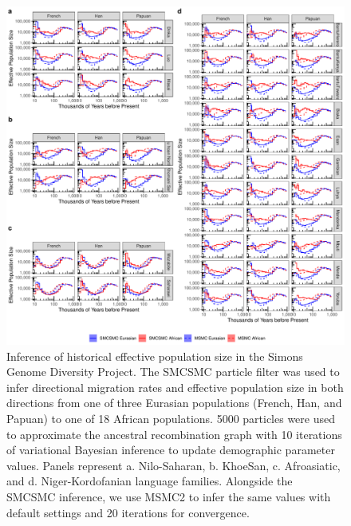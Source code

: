\begin{figure}
	\centering
	\includegraphics[width=0.95\linewidth]{plot/sgdp_ne_new.pdf}
	\caption[Effective population size inference in the Simons Genome Diversity Project from SMCSMC and MSMC2]{Inference of historical effective population size in the Simons Genome Diversity Project. The SMCSMC particle filter was used to infer directional migration rates and effective population size in both directions from one of three Eurasian populations (French, Han, and Papuan) to one of 18 African populations. 5000 particles were used to approximate the ancestral recombination graph with 10 iterations of variational Bayesian inference to update demographic parameter values. Panels represent a. Nilo-Saharan, b. KhoeSan, c. Afroasiatic, and d. Niger-Kordofanian language families. Alongside the SMCSMC inference, we use MSMC2 to infer the same values with default settings and 20 iterations for convergence.}	
	\label{fig:sgdp_ne}
\end{figure}

